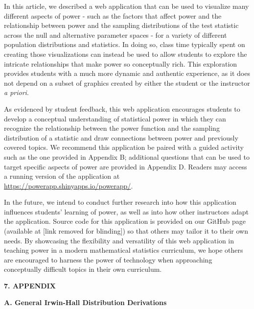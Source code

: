 \documentclass{TISE}
\begin{document}
In this article, we described a web application that can be used to visualize many different aspects of power - such as the factors that affect power and the relationship between power and the sampling distributions of the test statistic across the null and alternative parameter spaces - for a variety of different population distributions and statistics. In doing so, class time typically spent on creating those visualizations can instead be used to allow students to explore the intricate relationships that make power so conceptually rich. This exploration provides students with a much more dynamic and authentic experience, as it does not depend on a subset of graphics created by either the student or the instructor \textit{a priori}. 

As evidenced by student feedback, this web application encourages students to develop a conceptual understanding of statistical power in which they can recognize the relationship between the power function and the sampling distribution of a statistic and draw connections between power and previously covered topics. We recommend this application be paired with a guided activity such as the one provided in Appendix B; additional questions that can be used to target specific aspects of power are provided in Appendix D. Readers may access a running version of the application at \url{https://powerapp.shinyapps.io/powerapp/}.

In the future, we intend to conduct further research into how this application influences students' learning of power, as well as into how other instructors adapt the application.  Source code for this application is provided on our GitHub page (available at [link removed for blinding]) so that others may tailor it to their own needs. By showcasing the flexibility and versatility of this web application in teaching power in a modern mathematical statistics curriculum, we hope others are encouraged to harness the power of technology when approaching conceptually difficult topics in their own curriculum. 

\newpage

\renewcommand\refname{\large 6. REFERENCES}


\newpage

\begin{center}
	\textbf{\large 7. APPENDIX}
\end{center}

\begin{center}
	\textbf{\large A. General Irwin-Hall Distribution Derivations}
\end{center}
\end{document}
